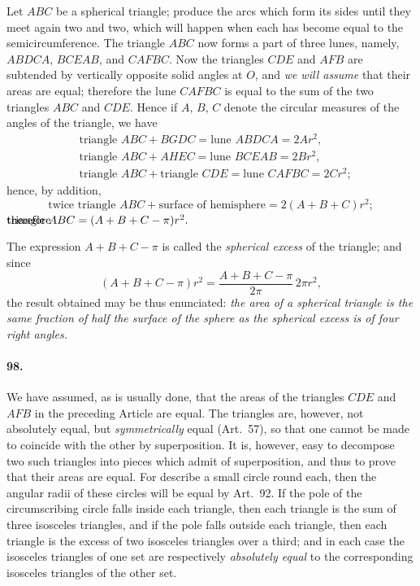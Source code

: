 \documentclass{book}[2004/02/16]
\begin{document}
\begin{mainmatter}
\begin{spacing}{1.3}
Let $ABC$ be a spherical triangle; produce the arcs which form
its sides until they meet again two and two, which will happen
when each has become equal to the semicircumference. The
triangle $ABC$ now forms a part of three lunes, namely, $ABDCA$,
$BCEAB$, and $CAFBC$. Now the triangles $CDE$ and $AFB$ are
subtended by vertically opposite solid angles at $O$, and \textit{we will
assume} that their areas are equal; therefore the lune $CAFBC$ is
equal to the sum of the two triangles $ABC$ and $CDE$. Hence if
$A$, $B$, $C$ denote the circular measures of the angles of the triangle,
we have
\begin{align*}
& \text{triangle } ABC+BGDC = \text{lune } ABDCA = 2Ar^2, \\
& \text{triangle } ABC+AHEC = \text{lune } BCEAB = 2Br^2, \\
& \text{triangle } ABC+\text{triangle } CDE
= \text{lune } CAFBC = 2Cr^2;
\end{align*}
hence, by addition,
\[
  \text{twice triangle } ABC + \text{surface of hemisphere}
= 2(A+B+C)r^2;
\]
$\rlap{therefore }\hfill
  \text{triangle } ABC=(A+B+C-\pi)r^2.
\hfill$

The expression $A+B+C-\pi$ is called the \textit{spherical excess} of
the triangle; and since
\[
  (A+B+C-\pi)r^2 = \dfrac{A+B+C-\pi}{2\pi}\, 2\pi r^2,
\]
the result obtained may be thus enunciated: \textit{the area of a spherical
triangle is the same fraction of half the surface of the sphere as the
spherical excess is of four right angles.}

\paragraph{98.} We have assumed, as is usually done, that the areas of
the triangles $CDE$ and $AFB$ in the preceding Article are equal.
The triangles are, however, not absolutely equal, but \textit{symmetrically}
equal (Art.\ 57), so that one cannot be made to coincide
with the other by superposition. It is, however, easy to decompose
two such triangles into pieces which admit of superposition,
and thus to prove that their areas are equal. For describe a
small circle round each, then the angular radii of these circles
will be equal by Art.~92. If the pole of the circumscribing circle
falls inside each triangle, then each triangle is the sum of three
isosceles triangles, and if the pole falls outside each triangle, then
each triangle is the excess of two isosceles triangles over a third;
and in each case the isosceles triangles of one set are respectively
\textit{absolutely equal} to the corresponding isosceles triangles of the
other set.


\end{spacing}
\end{mainmatter}
\end{document}
